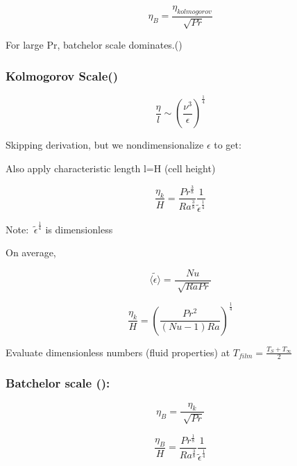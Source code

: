 \documentclass[12pt]{article}
\renewcommand{\_}{\kern-1.5pt\textunderscore\kern-1.5pt}
\begin{document}
 \[  \eta _{B}=\frac{ \eta _{kolmogorov}}{\sqrt[]{Pr}} \] \par

For large Pr, batchelor scale dominates.(\cite{Scheel2013})\par

\subsubsection{Kolmogorov Scale(\cite{Scheel2013})}\par

 \[ \frac{ \eta }{l} \sim  \left( \frac{ \nu ^{3}}{ \epsilon } \right) ^{\frac{1}{4}} \] \par

Skipping derivation, but we nondimensionalize  \(  \epsilon  \)  to get:\par

Also apply characteristic length l=H (cell height) \par

 \[ \frac{ \eta _{k}}{H}=\frac{Pr^{\frac{3}{8}}}{Ra^{\frac{3}{8}}}\frac{1}{\widetilde{ \epsilon }^{\frac{1}{4}}} \] \par

Note: \( ~\widetilde{ \epsilon }^{\frac{1}{4}} \)  is dimensionless\par

On average,\par

 \[ \widetilde{ \langle  \epsilon  \rangle }=\frac{Nu}{\sqrt[]{RaPr}} \] \par

 \[ \frac{ \eta _{k}}{H}= \left( \frac{Pr^{2}}{ \left( Nu-1 \right) Ra} \right) ^{\frac{1}{4}} \] \par

Evaluate dimensionless numbers (fluid properties) at  \( T_{film}=\frac{T_{S}+T_{\infty}}{2} \) \par

\subsubsection{Batchelor scale (\cite{Scheel2013}):}\par

 \[  \eta _{B}=\frac{ \eta _{k}}{\sqrt[]{Pr}} \] \par

 \[ \frac{ \eta _{B}}{H}=\frac{Pr^{\frac{1}{8}}}{Ra^{\frac{3}{8}}}\frac{1}{\widetilde{ \epsilon }^{\frac{1}{4}}} \] \par
\end{document}

